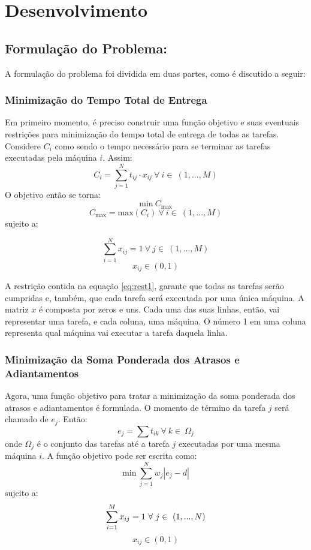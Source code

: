 \documentclass[conference]{IEEEtran}
\begin{document}
\section{Desenvolvimento}
\subsection{Formulação do Problema:}
A formulação do problema foi dividida em duas partes, como é discutido a seguir:

\subsubsection{Minimização do Tempo Total de Entrega}
Em primeiro momento, é preciso construir uma função objetivo e suas eventuais restrições para minimização do tempo total de entrega de todas as tarefas. Considere $C_i$ como sendo o tempo necessário para se terminar as tarefas executadas pela máquina $i$. Assim:
\[C_i = \sum_{j=1}^{N}t_{ij} \cdot x_{ij}\ \forall\ i \in\ (1,...,M) \]
O objetivo então se torna:
\[\mathrm{min}\ C_{\mathrm{max}} \]
\[C_{\mathrm{max}} = \mathrm{max}(C_i)\ \forall\ i \in\ (1,...,M) \]
sujeito a:

\begin{equation}
	\sum_{i=1}^{N}x_{ij}=1\ \forall\ j \in\ (1,...,M)
	\label{eq:rest1}
\end{equation}
\[ x_{ij} \in (0, 1)\]

A restrição contida na equação \ref{eq:rest1}, garante que todas as tarefas serão cumpridas e, também, que cada tarefa será executada por uma única máquina. A matriz $x$ é composta por zeros e uns. Cada uma das suas linhas, então, vai representar uma tarefa, e cada coluna, uma máquina. O número 1 em uma coluna representa qual máquina vai executar a tarefa daquela linha.

\subsubsection{Minimização da Soma Ponderada dos Atrasos e Adiantamentos}
Agora, uma função objetivo para tratar a minimização da soma ponderada dos atrasos e adiantamentos é formulada. O momento de término da tarefa $j$ será chamado de $e_j$. Então:
\[e_j = \sum{}{}t_{ik}\ \forall\ k \in\ \Omega_j \]
onde $\Omega_j$ é o conjunto das tarefas até a tarefa $j$ executadas por uma mesma máquina $i$. A função objetivo pode ser escrita como:
\[\mathrm{min}\ \sum_{j=1}^{N}w_j|e_j-d| \]
sujeito a:
\begin{equation}
\sum_{i=1}^{M}x_{ij}=1\ \forall\ j \in\ (1,...,N)\\
\label{eq:rest3}
\end{equation}
\[x_{ij} \in (0, 1)\]
\end{document}
